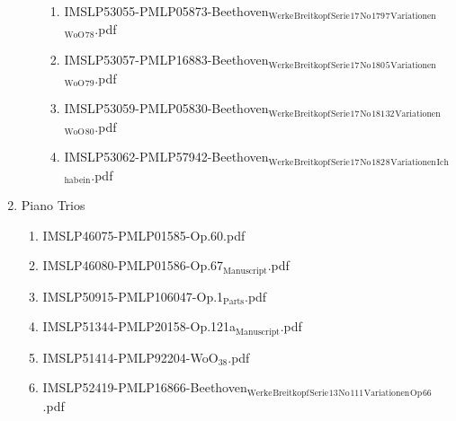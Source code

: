 \documentclass[11pt]{article}
\begin{document}
\begin{enumerate}
\begin{enumerate}
\begin{enumerate}
\item IMSLP53055-PMLP05873-Beethoven$_{\text{Werke}}$$_{\text{Breitkopf}}$$_{\text{Serie}}$$_{\text{17}}$$_{\text{No}}$$_{\text{179}}$$_{\text{7}}$$_{\text{Variationen}}$$_{\text{WoO}}$$_{\text{78}}$.pdf
\label{sec-1-1-1-1-44-9-6-9-22}

\item IMSLP53057-PMLP16883-Beethoven$_{\text{Werke}}$$_{\text{Breitkopf}}$$_{\text{Serie}}$$_{\text{17}}$$_{\text{No}}$$_{\text{180}}$$_{\text{5}}$$_{\text{Variationen}}$$_{\text{WoO}}$$_{\text{79}}$.pdf
\label{sec-1-1-1-1-44-9-6-9-23}

\item IMSLP53059-PMLP05830-Beethoven$_{\text{Werke}}$$_{\text{Breitkopf}}$$_{\text{Serie}}$$_{\text{17}}$$_{\text{No}}$$_{\text{181}}$$_{\text{32}}$$_{\text{Variationen}}$$_{\text{WoO}}$$_{\text{80}}$.pdf
\label{sec-1-1-1-1-44-9-6-9-24}

\item IMSLP53062-PMLP57942-Beethoven$_{\text{Werke}}$$_{\text{Breitkopf}}$$_{\text{Serie}}$$_{\text{17}}$$_{\text{No}}$$_{\text{182}}$$_{\text{8}}$$_{\text{Variationen}}$$_{\text{Ich}}$$_{\text{hab}}$$_{\text{ein}}$.pdf
\label{sec-1-1-1-1-44-9-6-9-25}
\end{enumerate}
\end{enumerate}

\item Piano Trios
\label{sec-1-1-1-1-44-9-7}
\begin{enumerate}
\item IMSLP46075-PMLP01585-Op.60.pdf
\label{sec-1-1-1-1-44-9-7-1}

\item IMSLP46080-PMLP01586-Op.67$_{\text{Manuscript}}$.pdf
\label{sec-1-1-1-1-44-9-7-2}

\item IMSLP50915-PMLP106047-Op.1$_{\text{Parts}}$.pdf
\label{sec-1-1-1-1-44-9-7-3}

\item IMSLP51344-PMLP20158-Op.121a$_{\text{Manuscript}}$.pdf
\label{sec-1-1-1-1-44-9-7-4}

\item IMSLP51414-PMLP92204-WoO$_{\text{38}}$.pdf
\label{sec-1-1-1-1-44-9-7-5}

\item IMSLP52419-PMLP16866-Beethoven$_{\text{Werke}}$$_{\text{Breitkopf}}$$_{\text{Serie}}$$_{\text{13}}$$_{\text{No}}$$_{\text{111}}$$_{\text{Variationen}}$$_{\text{Op}}$$_{\text{66}}$.pdf
\label{sec-1-1-1-1-44-9-7-6}


\end{enumerate}
\end{enumerate}
\end{document}
